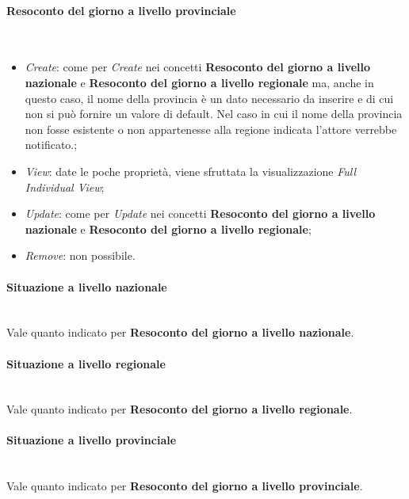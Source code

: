\paragraph{Resoconto del giorno a livello provinciale}\mbox{}\\
\begin{itemize}
    \item \textit{Create}: come per \textit{Create} nei concetti \textbf{Resoconto del giorno a livello nazionale} e \textbf{Resoconto del giorno a livello regionale} ma, anche in questo caso, il nome della provincia è un dato necessario da inserire e di cui non si può fornire un valore di default.
    Nel caso in cui il nome della provincia non fosse esistente o non appartenesse alla regione indicata l'attore verrebbe notificato.;
    \item \textit{View}: date le poche proprietà, viene sfruttata la visualizzazione \textit{Full Individual View};
    \item \textit{Update}: come per \textit{Update} nei concetti \textbf{Resoconto del giorno a livello nazionale} e \textbf{Resoconto del giorno a livello regionale};
    \item \textit{Remove}: non possibile.
\end{itemize}

\paragraph{Situazione a livello nazionale}\mbox{}\\
Vale quanto indicato per \textbf{Resoconto del giorno a livello nazionale}.

\paragraph{Situazione a livello regionale}\mbox{}\\
Vale quanto indicato per \textbf{Resoconto del giorno a livello regionale}.

\paragraph{Situazione a livello provinciale}\mbox{}\\
Vale quanto indicato per \textbf{Resoconto del giorno a livello provinciale}.

